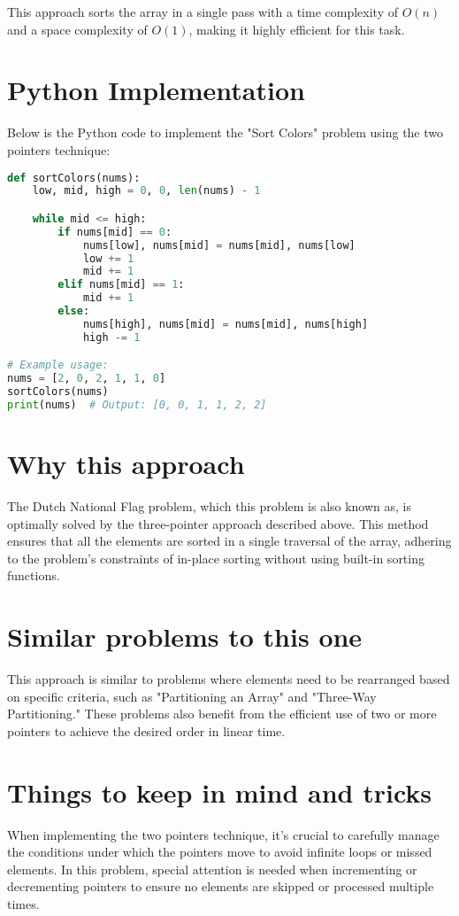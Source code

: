 This approach sorts the array in a single pass with a time complexity of \(O(n)\) and a space complexity of \(O(1)\), making it highly efficient for this task.

\section*{Python Implementation}

Below is the Python code to implement the "Sort Colors" problem using the two pointers technique:

\begin{fullwidth}
\begin{lstlisting}[language=Python]
def sortColors(nums):
    low, mid, high = 0, 0, len(nums) - 1

    while mid <= high:
        if nums[mid] == 0:
            nums[low], nums[mid] = nums[mid], nums[low]
            low += 1
            mid += 1
        elif nums[mid] == 1:
            mid += 1
        else:
            nums[high], nums[mid] = nums[mid], nums[high]
            high -= 1

# Example usage:
nums = [2, 0, 2, 1, 1, 0]
sortColors(nums)
print(nums)  # Output: [0, 0, 1, 1, 2, 2]
\end{lstlisting}

\end{fullwidth}

\section*{Why this approach}

The Dutch National Flag problem, which this problem is also known as, is optimally solved by the three-pointer approach described above. This method ensures that all the elements are sorted in a single traversal of the array, adhering to the problem's constraints of in-place sorting without using built-in sorting functions.

\section*{Similar problems to this one}

This approach is similar to problems where elements need to be rearranged based on specific criteria, such as "Partitioning an Array" and "Three-Way Partitioning." These problems also benefit from the efficient use of two or more pointers to achieve the desired order in linear time.

\section*{Things to keep in mind and tricks}

When implementing the two pointers technique, it's crucial to carefully manage the conditions under which the pointers move to avoid infinite loops or missed elements. In this problem, special attention is needed when incrementing or decrementing pointers to ensure no elements are skipped or processed multiple times.